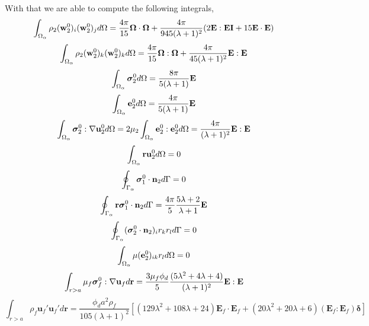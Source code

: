 With that we are able to compute the following integrals,
\begin{equation*}
    \int_{\Omega_\alpha} \rho_2(\textbf{w}_2^0)_i (\textbf{w}_2^0)_j d\Omega
    = \frac{4\pi}{15}\bm\Omega\cdot\bm\Omega
    + \frac{4\pi}{945(\lambda+1)^2}
    (2\textbf{E}:\textbf{EI} + 15 \textbf{E}\cdot \textbf{E})
\end{equation*}
\begin{equation*}
    \int_{\Omega_\alpha} \rho_2(\textbf{w}_2^0)_k (\textbf{w}_2^0)_k d\Omega
    = \frac{4\pi}{15}\bm\Omega:\bm\Omega
    + \frac{4\pi}{45(\lambda+1)^2}
    \textbf{E}:\textbf{E} 
\end{equation*} 
\begin{equation*}
    \int_{\Omega_\alpha} \bm\sigma_2^0 d\Omega
    = \frac{8\pi}{5(\lambda+1)}
    \textbf{E}
\end{equation*}
\begin{equation*}
    \int_{\Omega_\alpha} \textbf{e}_2^0 d\Omega
    = \frac{4\pi}{5(\lambda+1)}
    \textbf{E}
\end{equation*}
\begin{equation*}
    \int_{\Omega_\alpha} \bm{\sigma}_2^0:\mathbf{\nabla} \textbf{u}_2^0 d\Omega
    = 2\mu_2 \int_{\Omega_\alpha} \textbf{e}_2^0: \textbf{e}_2^0  d\Omega
    = 
    \frac{4\pi}{(\lambda+1)^2}\textbf{E}:\textbf{E}
\end{equation*}
\begin{align*}
    \int_{\Omega_\alpha} \textbf{r}\textbf{u}_2^0 d\Omega
    = 0 
\end{align*}
\begin{equation*}
    \oint_{\Gamma_\alpha} \bm\sigma_1^0\cdot \textbf{n}_2 d\Gamma
    = 0
\end{equation*}
\begin{equation*}
    \oint_{\Gamma_\alpha} \textbf{r}\bm\sigma_1^0\cdot \textbf{n}_2 d\Gamma
    = \frac{4\pi}{5}\frac{5\lambda+2}{\lambda+1}\textbf{E} 
\end{equation*}
\begin{equation*}
    \oint_{\Gamma_\alpha} (\bm\sigma_2^0\cdot \textbf{n}_2)_i r_kr_l d\Gamma
    = 0
\end{equation*}
\begin{equation*}
    \int_{\Omega_\alpha} \mu(\textbf{e}_2^0)_{ik} r_l d\Omega =
    0
\end{equation*}
\begin{equation*}
    \int_{r>a} \mu_f \bm\sigma^0_f:\mathbf{\nabla} \textbf{u}_f  d\textbf{r}
    = 
    \frac{3\mu_f \phi_d}{5}
    \frac{(5\lambda^2 + 4\lambda +4)}{(\lambda + 1)^2}
    \textbf{E}:\textbf{E}
\end{equation*}
\begin{equation*}
    \int_{r>a} \rho_f \textbf{u}_f' \textbf{u}_f'  d\textbf{r}
    = 
    \frac{\phi_d a^2 \rho_f}{105 (\lambda +1)^2 }\left[
        (129\lambda^2+108\lambda+24)\textbf{E}_f\cdot \textbf{E}_f
        + (20\lambda^2 +20\lambda + 6)
        (\textbf{E}_f : \textbf{E}_f)\bm\delta
    \right]
\end{equation*}
